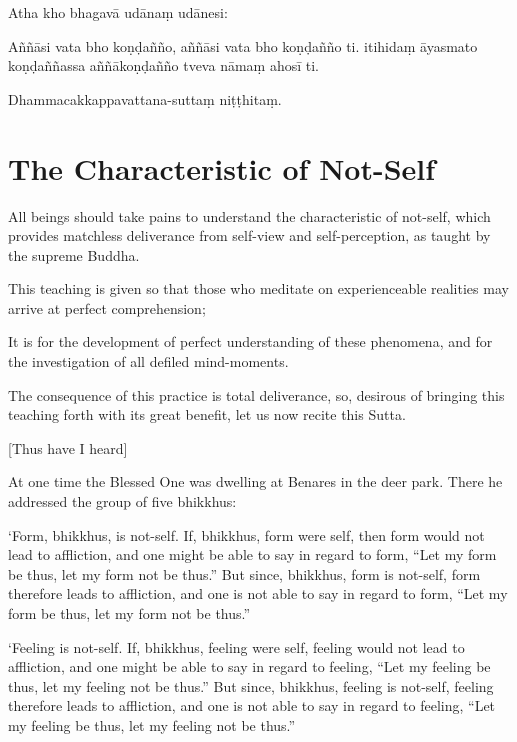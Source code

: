 Atha kho bhagavā udānaṃ udānesi:

Aññāsi vata bho koṇḍañño, aññāsi vata bho koṇḍañño ti. itihidaṃ āyasmato
koṇḍaññassa aññākoṇḍañño tveva nāmaṃ ahosī ti.

Dhammacakkappavattana-suttaṃ niṭṭhitaṃ.

\chapterTocDelegatePageNumber
\chapter{The Characteristic of Not-Self}%

\setTocDelegatedPageNumber
\englishText
\renewcommand{\englishTitle}{The Characteristic of Not-Self}

\begin{leader}

All beings should take pains to understand the characteristic of
not-self, which provides matchless deliverance from self-view and
self-perception, as taught by the supreme Buddha.

This teaching is given so that those who meditate on experienceable
realities may arrive at perfect comprehension;

It is for the development of perfect understanding of these phenomena,
and for the investigation of all defiled mind-moments.

The consequence of this practice is total deliverance, so, desirous of
bringing this teaching forth with its great benefit, let us now recite
this Sutta.

\end{leader}

[Thus have I heard]

At one time the Blessed One was dwelling at Benares in the deer park.
There he addressed the group of five bhikkhus:

‘Form, bhikkhus, is not-self. If, bhikkhus, form were self, then form
would not lead to affliction, and one might be able to say in regard to
form, “Let my form be thus, let my form not be thus.” But since,
bhikkhus, form is not-self, form therefore leads to affliction, and one
is not able to say in regard to form, “Let my form be thus, let my form
not be thus.”

‘Feeling is not-self. If, bhikkhus, feeling were self, feeling would
not lead to affliction, and one might be able to say in regard to
feeling, “Let my feeling be thus, let my feeling not be thus.” But
since, bhikkhus, feeling is not-self, feeling therefore leads to
affliction, and one is not able to say in regard to feeling, “Let my
feeling be thus, let my feeling not be thus.”

